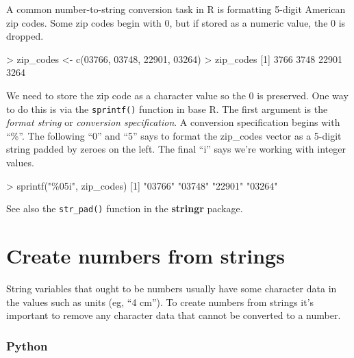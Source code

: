 \documentclass[
]{book}
\newenvironment{Shaded}{\begin{snugshade}}{\end{snugshade}}
\newcommand{\DecValTok}[1]{\textcolor[rgb]{0.00,0.00,0.81}{#1}}
\newcommand{\FunctionTok}[1]{\textcolor[rgb]{0.00,0.00,0.00}{#1}}
\newcommand{\NormalTok}[1]{#1}
\newcommand{\OtherTok}[1]{\textcolor[rgb]{0.56,0.35,0.01}{#1}}
\newcommand{\SpecialCharTok}[1]{\textcolor[rgb]{0.00,0.00,0.00}{#1}}
\newcommand{\StringTok}[1]{\textcolor[rgb]{0.31,0.60,0.02}{#1}}
\begin{document}
A common number-to-string conversion task in R is formatting 5-digit American zip codes. Some zip codes begin with 0, but if stored as a numeric value, the 0 is dropped.

\begin{Shaded}
\begin{Highlighting}[]
\SpecialCharTok{\textgreater{}}\NormalTok{ zip\_codes }\OtherTok{\textless{}{-}} \FunctionTok{c}\NormalTok{(}\DecValTok{03766}\NormalTok{, }\DecValTok{03748}\NormalTok{, }\DecValTok{22901}\NormalTok{, }\DecValTok{03264}\NormalTok{)}
\SpecialCharTok{\textgreater{}}\NormalTok{ zip\_codes}
\NormalTok{[}\DecValTok{1}\NormalTok{]  }\DecValTok{3766}  \DecValTok{3748} \DecValTok{22901}  \DecValTok{3264}
\end{Highlighting}
\end{Shaded}

We need to store the zip code as a character value so the 0 is preserved. One way to do this is via the \texttt{sprintf()} function in base R. The first argument is the \emph{format string} or \emph{conversion specification}. A conversion specification begins with ``\%''. The following ``0'' and ``5'' says to format the zip\_codes vector as a 5-digit string padded by zeroes on the left. The final ``i'' says we're working with integer values.

\begin{Shaded}
\begin{Highlighting}[]
\SpecialCharTok{\textgreater{}} \FunctionTok{sprintf}\NormalTok{(}\StringTok{"\%05i"}\NormalTok{, zip\_codes)}
\NormalTok{[}\DecValTok{1}\NormalTok{] }\StringTok{"03766"} \StringTok{"03748"} \StringTok{"22901"} \StringTok{"03264"}
\end{Highlighting}
\end{Shaded}

See also the \texttt{str\_pad()} function in the \textbf{stringr} package.

\hypertarget{create-numbers-from-strings}{%
\section{Create numbers from strings}\label{create-numbers-from-strings}}

String variables that ought to be numbers usually have some character data in the values such as units (eg, ``4 cm''). To create numbers from strings it's important to remove any character data that cannot be converted to a number.

\hypertarget{python-23}{%
\subsubsection*{Python}\label{python-23}}
\end{document}
